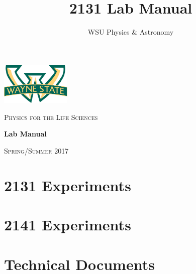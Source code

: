 \documentclass[hidelinks,12pt,letterpaper,twoside]{book}
\author{WSU Physics \& Astronomy}
\title{2131 Lab Manual}
\newcommand\blankpage{%
    \null
    \thispagestyle{empty}%
    \newpage}
\begin{document}
\begin{titlepage}
	\centering
	\includegraphics[width=0.25\textwidth]{wsu_logo}\par\vspace{1cm}
	{\scshape\LARGE Physics for the Life Sciences \par}	
	\vfill
	\textbf{\huge Lab Manual} \par
	\vfill
	{\scshape\large Spring/Summer 2017 \par}
\end{titlepage}

\newpage{\blankpage}



\newpage{\blankpage}

\renewcommand\contentsname{Physics for the Life Sciences}
\setcounter{tocdepth}{1}
\tableofcontents{\thispagestyle{fancy}}


\part{2131 Experiments}
\renewcommand{\chaptername}{Experiment}



\newpage{\blankpage}



\part{2141 Experiments}
\setcounter{chapter}{5}

\newpage{\blankpage}






\part{Technical Documents}
\renewcommand{\chaptername}{Technical Document}
\renewcommand\thechapter{\Alph{chapter}}
\newpage{\blankpage}
\newpage{\blankpage}
\newpage{\blankpage}
\newpage{\blankpage}
\newpage{\blankpage}
\end{document}
